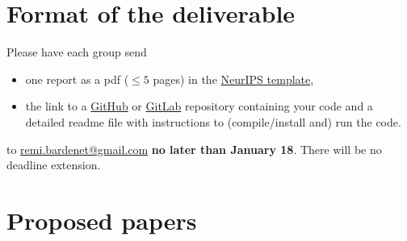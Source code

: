 \documentclass[12pt]{article}%
\begin{document}
\section{Format of the deliverable}
Please have each group send
\begin{itemize}
\item one report as a pdf ($\leq 5$ pages) in the \href{https://www.overleaf.com/latex/templates/neurips-2020/mnshsmqkjsqz}{NeurIPS template},
\item the link to a \href{https://github.com/}{GitHub} or  \href{https://about.gitlab.com/}{GitLab} repository containing your code and a detailed readme file with
  instructions to (compile/install and) run the code.
\end{itemize} to \href{mailto:remi.bardenet@gmail.com}{remi.bardenet@gmail.com} {\bf no later than January 18}. There will be no deadline extension.

\section{Proposed papers}
\label{s:papers}



\end{document}
